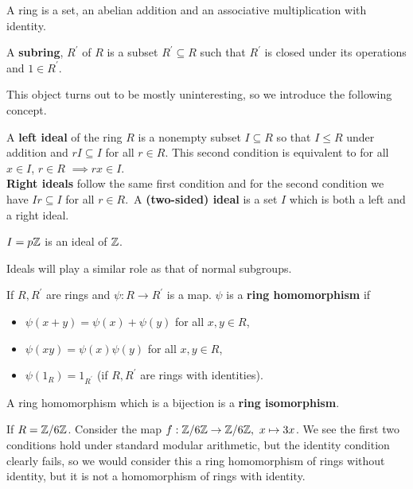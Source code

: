 \begin{recall}
	A ring is a set, an abelian addition and an associative multiplication with identity.
\end{recall}
\begin{definition}[Subring]
	A \textbf{subring},  \(R^{\prime}\) of \(R\) is a subset \(R^{\prime} \subseteq R\) such that \(R^{\prime}\) is closed under its operations and \(1 \in R^{\prime}\).
\end{definition}
This object turns out to be mostly uninteresting, so we introduce the following concept.
\begin{definition}[Ideal]
	A \textbf{left ideal} of the ring \(R\) is a nonempty subset \(I \subseteq R\) so that \(I \le R\) under addition and \(rI \subseteq I\) for all \(r \in R\). This second condition is equivalent to for all \(x \in I\), \(r \in R	\)  \(\implies rx \in I\).\\
	\textbf{Right ideals} follow the same first condition and for the second condition we have \(Ir \subseteq I\) for all \(r \in R\).\
	A \textbf{(two-sided) ideal} is a set \(I\) which is both a left and a right ideal.
\end{definition}
\begin{example}
	\(I = p\mathbb{Z}\) is an ideal of \(\mathbb{Z}\).\\
\end{example}
Ideals will play a similar role as that of normal subgroups.
\begin{definition}
If \(R, R^{\prime}\) 	are rings and \(\psi: R \to R^{\prime}\) is a map. \(\psi\) is a \textbf{ring homomorphism} if
\begin{itemize}
	\item \(\psi\left( x + y \right) = \psi (x) + \psi (y) \) for all \(x, y \in R\),
	\item \(\psi\left( xy \right)  = \psi\left( x \right) \psi\left( y \right) \) for all \(x, y \in R\),
	\item \(\psi\left( 1_{R} \right) = 1_{R^{\prime}}\)  (if \(R, R^{\prime}\) are rings with identities).
\end{itemize}
A ring homomorphism which is a bijection is a \textbf{ring isomorphism}.
\end{definition}
\begin{example}
	If \(R = \mathbb{Z} / 6\mathbb{Z}\). Consider the map \(f: \mathbb{Z} / 6\mathbb{Z} \to \mathbb{Z} / 6\mathbb{Z}, \ x \mapsto 3x\). We see the first two conditions hold under standard modular arithmetic, but the identity condition clearly fails, so we would consider this a ring homomorphism of rings without identity, but it is not a homomorphism of rings with identity.
\end{example}
